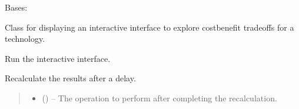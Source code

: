\documentclass[letterpaper,10pt,english]{sphinxmanual}
\begin{document}
\begin{fulllineitems}
\label{\detokenize{tyche:tyche.DecisionGUI.DecisionWindow}}
\pysigstartsignatures
{}
\pysigstopsignatures
\sphinxAtStartPar
Bases: 

\sphinxAtStartPar
Class for displaying an interactive interface to explore cost\sphinxhyphen{}benefit tradeoffs for a technology.

\begin{fulllineitems}
\label{\detokenize{tyche:tyche.DecisionGUI.DecisionWindow.create_figure}}
\pysigstartsignatures
{}
\pysigstopsignatures
\end{fulllineitems}


\begin{fulllineitems}
\label{\detokenize{tyche:tyche.DecisionGUI.DecisionWindow.mainloop}}
\pysigstartsignatures
{}
\pysigstopsignatures
\sphinxAtStartPar
Run the interactive interface.

\end{fulllineitems}


\begin{fulllineitems}
\label{\detokenize{tyche:tyche.DecisionGUI.DecisionWindow.reevaluate}}
\pysigstartsignatures
{}
\pysigstopsignatures
\sphinxAtStartPar
Recalculate the results after a delay.
\begin{quote}\begin{description}
\begin{itemize}
\item {} 
\sphinxAtStartPar
{} () – The operation to perform after completing the recalculation.


\end{itemize}
\end{description}
\end{quote}
\end{fulllineitems}
\end{fulllineitems}
\end{document}
